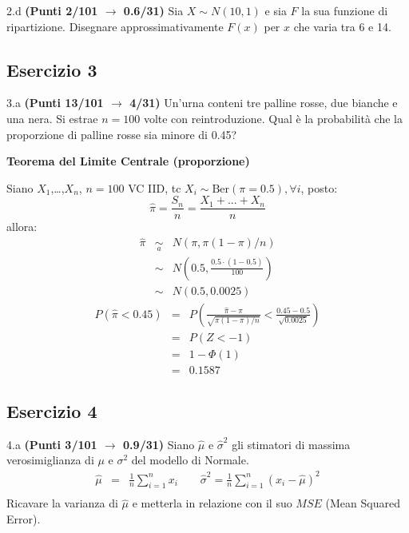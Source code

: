 \documentclass[
  11pt,
]{book}
\theoremstyle{mytheoremstyle}
\theoremstyle{mydefstyle}
\newenvironment{sol}
  {
  \begin{tcolorbox}[enhanced,breakable,arc=0.1mm,boxrule=1pt,colback=white,colframe=iblue,
  title=\bf \fontfamily{lmss}\selectfont \hspace{.5 cm} Soluzione,drop fuzzy shadow]

}{
\end{tcolorbox}
  }
\begin{document}
2.d \textbf{(Punti 2/101 \(\rightarrow\) 0.6/31)} Sia \(X\sim N(10,1)\) e sia \(F\) la sua funzione di ripartizione. Disegnare approssimativamente \(F(x)\) per \(x\) che varia tra 6 e 14.

\subsection{Esercizio 3}\label{esercizio-3-23}

3.a \textbf{(Punti 13/101 \(\rightarrow\) 4/31)} Un'urna conteni tre palline rosse, due bianche e una nera. Si estrae \(n=100\) volte con reintroduzione. Qual è la probabilità che la proporzione di palline rosse sia minore di 0.45?

\begin{sol}
\textbf{Teorema del Limite Centrale (proporzione)}

Siano \(X_1\),\ldots,\(X_n\), \(n=100\) VC IID, tc \(X_i\sim\text{Ber}(\pi=0.5)\)\(,\forall i\), posto:
\[
      \hat\pi=\frac{S_n}n = \frac{X_1 + ... + X_n}n
      \]
allora:\begin{eqnarray*}
  \hat\pi & \mathop{\sim}\limits_{a}& N(\pi,\pi(1-\pi)/n) \\
  &\sim & N\left(0.5,\frac{0.5\cdot(1-0.5)}{100}\right) \\
     &\sim & N(0.5,0.0025) 
  \end{eqnarray*}\begin{eqnarray*}
      P( \hat\pi   <   0.45 ) 
        &=& P\left(  \frac { \hat\pi  -  \pi }{ \sqrt{\pi(1-\pi)/n} }  <  \frac { 0.45  -  0.5 }{\sqrt{ 0.0025 }} \right)  \\
                 &=& P\left(  Z   <   -1 \right) \\    
                 &=&  1-\Phi( 1 ) \\ &=&  0.1587 
      \end{eqnarray*}

\end{sol}

\subsection{Esercizio 4}\label{esercizio-4-23}

4.a \textbf{(Punti 3/101 \(\rightarrow\) 0.9/31)} Siano \(\hat \mu\) e \(\hat\sigma^2\) gli stimatori di massima verosimiglianza di \(\mu\) e \(\sigma^2\) del modello di Normale.
\begin{eqnarray*}
  \hat\mu &=&  \frac 1n\sum_{i=1}^nx_i \qquad \hat\sigma^2 =  \frac 1n\sum_{i=1}^n(x_i-\hat\mu)^2\\
\end{eqnarray*}
Ricavare la varianza di \(\hat\mu\) e metterla in relazione con il suo \(MSE\) (Mean Squared Error).
\end{document}
